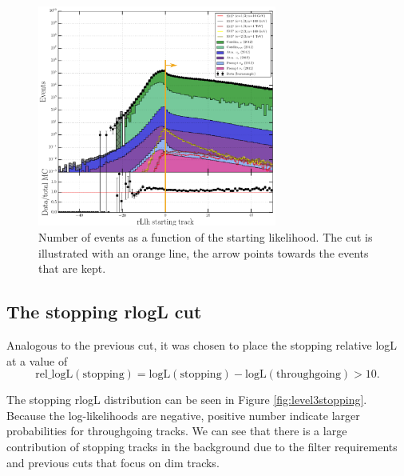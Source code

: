 \begin{figure}[t]
\centering
\includegraphics[width=0.7\textwidth]{chapter8/img/L3_zenithcut_gr_1p4835298642_rloglcut_less_15_npecut_less_50_1D_stack_finitereco_rllh_starting_new.png}
\caption{Number of events as a function of the starting likelihood. The cut is illustrated with an orange line, the arrow points towards the events that are kept.}
\label{fig:level3starting}
\end{figure}

\subsection{The stopping rlogL cut}
Analogous to the previous cut, it was chosen to place the stopping relative logL at a value of
\begin{equation}
\textrm{rel\_logL}(\textrm{stopping}) = \textrm{logL}(\textrm{stopping}) - \textrm{logL}(\textrm{throughgoing}) > 10. 
\end{equation}

The stopping rlogL distribution can be seen in Figure \ref{fig:level3stopping}. Because the log-likelihoods are negative, positive number indicate larger probabilities for throughgoing tracks. We can see that there is a large contribution of stopping tracks in the background due to the filter requirements and previous cuts that focus on dim tracks.

